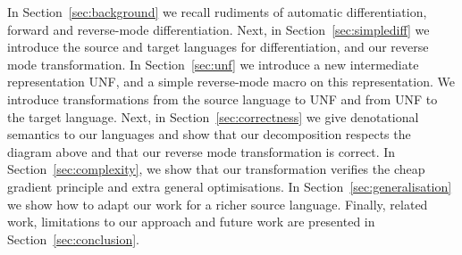 In Section~\ref{sec:background} we recall rudiments of automatic differentiation, forward and reverse-mode differentiation.
Next, in Section~\ref{sec:simplediff} we introduce the source and target languages for differentiation, and our reverse mode transformation. 
In Section~\ref{sec:unf} we introduce a new intermediate representation UNF, and a simple reverse-mode macro on this representation.
We introduce transformations from the source language to UNF and from UNF to the target language.
Next, in Section~\ref{sec:correctness} we give denotational semantics to our languages and show that our decomposition respects the diagram above and that our reverse mode transformation is correct.
In Section~\ref{sec:complexity}, we show that our transformation verifies the cheap gradient principle and extra general optimisations.
In Section~\ref{sec:generalisation} we show how to adapt our work for a richer source language. 
Finally, related work, limitations to our approach and future work are presented in Section~\ref{sec:conclusion}.